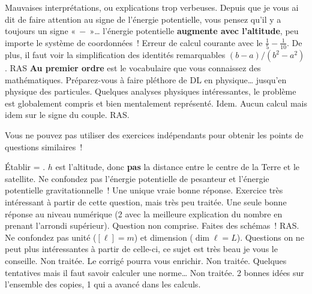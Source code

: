 \documentclass[a4paper, 10pt, final, garamond]{book}
\begin{document}
\setcounter{section}{0}
\begin{enumerate}
	Mauvaises interprétations, ou explications trop verbeuses.
	Depuis que je vous ai dit de faire attention au signe de l'énergie
	potentielle, vous pensez qu'il y a toujours un signe $«~-~»$… l'énergie
	potentielle \textbf{augmente avec l'altitude}, peu importe le système de
	coordonnées~!
	Erreur de calcul courante avec le $\frac{1}{5} - \frac{1}{10}$. De plus, il
	faut voir la simplification des identités remarquables $(b-a)/(b^2-a^2)$.
	RAS
	\textbf{Au premier ordre} est le vocabulaire que vous connaissez des
	mathématiques. Préparez-vous à faire pléthore de DL en physique… jusqu'en
	physique des particules.
	Quelques analyses physiques intéressantes, le problème est globalement
	compris et bien mentalement représenté.
	Idem.
	Aucun calcul mais idem sur le signe du couple.
	RAS.
\end{enumerate}

Vous ne pouvez pas utiliser des exercices indépendants pour obtenir les points
de questions similaires~!
\begin{enumerate}
	Établir = . $h$ est l'altitude, donc \textbf{pas} la distance
	entre le centre de la Terre et le satellite.
	Ne confondez pas l'énergie potentielle de pesanteur et l'énergie potentielle
	gravitationnelle~!
	Une unique vraie bonne réponse.
	Exercice très intéressant à partir de cette question, mais très peu traitée.
	Une seule bonne réponse au niveau numérique (2 avec la meilleure explication
	du nombre en prenant l'arrondi supérieur).
	Question non comprise. Faites des schémas~!
	RAS.
	Ne confondez pas unité ($[\ell] = \si{m}$) et dimension ($\dim{\ell} = L$).
	Questions on ne peut plus intéressantes à partir de celle-ci, ce sujet est
	très beau je vous le conseille.
	Non traitée. Le corrigé pourra vous enrichir.
	Non traitée.
	Quelques tentatives mais il faut savoir calculer une norme…
	Non traitée.
	2 bonnes idées sur l'ensemble des copies, 1 qui a avancé dans les calculs.
\end{enumerate}
\end{document}
